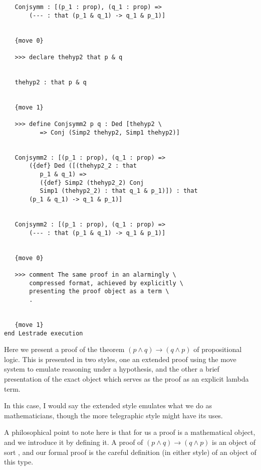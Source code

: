 \documentclass{slides}
\begin{document}
\begin{slide}
{\begin{verbatim}
   Conjsymm : [(p_1 : prop), (q_1 : prop) => 
       (--- : that (p_1 & q_1) -> q_1 & p_1)]


   {move 0}

   >>> declare thehyp2 that p & q


   thehyp2 : that p & q


   {move 1}

   >>> define Conjsymm2 p q : Ded [thehyp2 \
          => Conj (Simp2 thehyp2, Simp1 thehyp2)]


   Conjsymm2 : [(p_1 : prop), (q_1 : prop) => 
       ({def} Ded ([(thehyp2_2 : that 
          p_1 & q_1) => 
          ({def} Simp2 (thehyp2_2) Conj 
          Simp1 (thehyp2_2) : that q_1 & p_1)]) : that 
       (p_1 & q_1) -> q_1 & p_1)]


   Conjsymm2 : [(p_1 : prop), (q_1 : prop) => 
       (--- : that (p_1 & q_1) -> q_1 & p_1)]


   {move 0}

   >>> comment The same proof in an alarmingly \
       compressed format, achieved by explicitly \
       presenting the proof object as a term \
       .


   {move 1}
end Lestrade execution

\end{verbatim}
}

Here we present a proof of the theorem $(p \wedge q) \rightarrow (q \wedge p)$ of propositional logic.  This is presented in two styles, one an extended proof using the
move system to emulate reasoning under a hypothesis, and the other a brief presentation of the exact object which serves as the proof as an explicit lambda term.

In this case, I would say the extended style emulates what we do as mathematicians, though the more telegraphic style might have its uses.

A philosophical point to note here is that for us a proof is a mathematical object, and we introduce it by defining it.  A proof of $(p \wedge q) \rightarrow (q \wedge p)$ is
an object of sort , and our formal proof is the careful definition (in either style) of an object of this type.


\end{slide}
\end{document}
